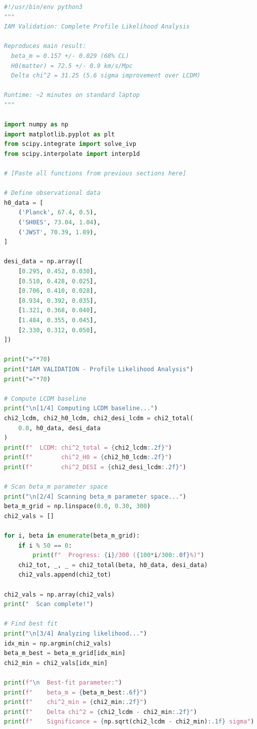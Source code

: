 \documentclass[11pt]{article}
\begin{document}
\begin{lstlisting}[language=Python]
#!/usr/bin/env python3
"""
IAM Validation: Complete Profile Likelihood Analysis

Reproduces main result:
  beta_m = 0.157 +/- 0.029 (68% CL)
  H0(matter) = 72.5 +/- 0.9 km/s/Mpc
  Delta chi^2 = 31.25 (5.6 sigma improvement over LCDM)
  
Runtime: ~2 minutes on standard laptop
"""

import numpy as np
import matplotlib.pyplot as plt
from scipy.integrate import solve_ivp
from scipy.interpolate import interp1d

# [Paste all functions from previous sections here]

# Define observational data
h0_data = [
    ('Planck', 67.4, 0.5),
    ('SH0ES', 73.04, 1.04),
    ('JWST', 70.39, 1.89),
]

desi_data = np.array([
    [0.295, 0.452, 0.030],
    [0.510, 0.428, 0.025],
    [0.706, 0.410, 0.028],
    [0.934, 0.392, 0.035],
    [1.321, 0.368, 0.040],
    [1.484, 0.355, 0.045],
    [2.330, 0.312, 0.050],
])

print("="*70)
print("IAM VALIDATION - Profile Likelihood Analysis")
print("="*70)

# Compute LCDM baseline
print("\n[1/4] Computing LCDM baseline...")
chi2_lcdm, chi2_h0_lcdm, chi2_desi_lcdm = chi2_total(
    0.0, h0_data, desi_data
)
print(f"  LCDM: chi^2_total = {chi2_lcdm:.2f}")
print(f"        chi^2_H0 = {chi2_h0_lcdm:.2f}")
print(f"        chi^2_DESI = {chi2_desi_lcdm:.2f}")

# Scan beta_m parameter space
print("\n[2/4] Scanning beta_m parameter space...")
beta_m_grid = np.linspace(0.0, 0.30, 300)
chi2_vals = []

for i, beta in enumerate(beta_m_grid):
    if i % 50 == 0:
        print(f"  Progress: {i}/300 ({100*i/300:.0f}%)")
    chi2_tot, _, _ = chi2_total(beta, h0_data, desi_data)
    chi2_vals.append(chi2_tot)

chi2_vals = np.array(chi2_vals)
print("  Scan complete!")

# Find best fit
print("\n[3/4] Analyzing likelihood...")
idx_min = np.argmin(chi2_vals)
beta_m_best = beta_m_grid[idx_min]
chi2_min = chi2_vals[idx_min]

print(f"\n  Best-fit parameter:")
print(f"    beta_m = {beta_m_best:.6f}")
print(f"    chi^2_min = {chi2_min:.2f}")
print(f"    Delta chi^2 = {chi2_lcdm - chi2_min:.2f}")
print(f"    Significance = {np.sqrt(chi2_lcdm - chi2_min):.1f} sigma")


\end{lstlisting}
\end{document}
